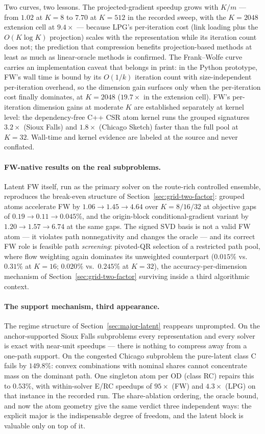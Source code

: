Two curves, two lessons. The projected-gradient speedup grows with
$K/m$ --- from $1.02$ at $K = 8$ to $7.70$ at $K = 512$ in the recorded sweep, with the $K = 2048$ extension cell at $9.4\times$ --- because LPG's per-iteration cost (link
loading plus the $O(K \log K)$ projection) scales with the
representation while its iteration count does not; the prediction that
compression benefits projection-based methods at least as much as
linear-oracle methods is confirmed. The Frank--Wolfe curve carries an
implementation caveat that belongs in print: in the Python prototype,
FW's wall time is bound by its $O(1/k)$ iteration count with
size-independent per-iteration overhead, so the dimension gain surfaces
only when the per-iteration cost finally dominates, at $K = 2048$
($19.7\times$ in the extension cell). FW's per-iteration dimension gains at moderate
$K$ are established separately at kernel level: the dependency-free C++
CSR atom kernel runs the grouped signatures $3.2\times$ (Sioux Falls)
and $1.8\times$ (Chicago Sketch) faster than the full pool at $K = 32$.
Wall-time and kernel evidence are labeled at the source and never
conflated.

\paragraph{FW-native results on the real subproblems.}
Latent FW itself, run as the primary solver on the route-rich controlled
ensemble, reproduces the break-even structure of
Section~\ref{sec:grid-two-factor}: grouped atoms accelerate FW by
$1.06 \to 1.45 \to 4.64$ over $K = 8/16/32$ at objective gaps of
$0.19 \to 0.11 \to 0.045\%$, and the origin-block conditional-gradient
variant by $1.20 \to 1.57 \to 6.74$ at the same gaps. The signed SVD
basis is not a valid FW atom --- it violates path nonnegativity and
changes the oracle --- and its correct FW role is feasible path
\emph{screening}: pivoted-QR selection of a restricted path pool, where
flow weighting again dominates its unweighted counterpart
($0.015\%$ vs.\ $0.31\%$ at $K = 16$; $0.020\%$ vs.\ $0.245\%$ at
$K = 32$), the accuracy-per-dimension mechanism of
Section~\ref{sec:grid-two-factor} surviving inside a third algorithmic
context.

\paragraph{The support mechanism, third appearance.}
The regime structure of Section~\ref{sec:major-latent} reappears
unprompted. On the anchor-supported Sioux Falls subproblems every
representation and every solver is exact with near-unit speedups ---
there is nothing to compress away from a one-path support. On the
congested Chicago subproblem the pure-latent class C fails by
$149.8\%$: convex combinations with nominal shares cannot concentrate
mass on the dominant path. One singleton atom per OD (class RC) repairs
this to $0.53\%$, with within-solver E/RC speedups of
$95\times$ (FW) and $4.3\times$ (LPG) on that instance in the recorded
run.
The share-ablation ordering, the oracle bound, and now the atom
geometry give the same verdict three independent ways: the explicit
major is the indispensable degree of freedom, and the latent block is
valuable only on top of it.

